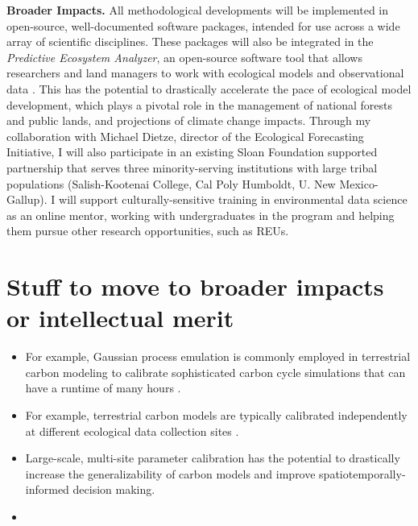\documentclass[11pt]{article}
\begin{document}
\noindent
\textbf{Broader Impacts.} All methodological developments will be implemented in open-source, well-documented software packages, intended for use across a wide array of scientific disciplines. These packages will also be integrated in the \textit{Predictive Ecosystem Analyzer}, an open-source software tool that allows researchers and land managers to work with ecological models and observational data \cite{Fer}. This has the potential to drastically accelerate the pace of ecological model development, which plays a pivotal role in the management of national forests and public lands, and projections of climate change impacts. Through my collaboration with Michael Dietze, director of the Ecological Forecasting Initiative, I will also participate in an existing Sloan Foundation supported partnership that serves three minority-serving institutions with large tribal populations (Salish-Kootenai College, Cal Poly Humboldt, U. New Mexico-Gallup). I will support culturally-sensitive training in environmental data science as an online mentor, working with undergraduates in the program and helping them pursue other research opportunities, such as REUs. 


\section{Stuff to move to broader impacts or intellectual merit}
\begin{itemize}
\item For example, Gaussian process emulation is commonly employed in terrestrial carbon modeling to calibrate sophisticated carbon cycle simulations that can have a runtime of many hours \cite{Fer}.
\item For example, terrestrial carbon models are typically calibrated independently at different ecological data collection sites \cite{Fer2}.
\item Large-scale, multi-site parameter calibration has the potential to drastically increase the generalizability of carbon models and improve spatiotemporally-informed decision making. 
\item 
\end{itemize}
\end{document}
